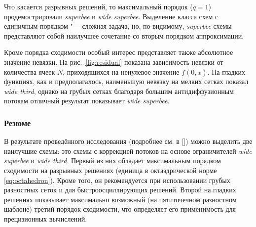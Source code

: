 Что касается разрывных решений, то максимальный порядок (\(q=1\)) продемострировали \textit{superbee} и \textit{wide superbee}.
Выделение класса схем с единичным порядком "--- сложная задача, но, по-видимому,
\textit{superbee} схемы представляют собой наилучшее сочетание со вторым порядком аппроксимации.

Кроме порядка сходимости особый интерес представляет также абсолютное значение невязки.
На рис.~\ref{fig:residual} показана зависимость невязки от количества ячеек \(N\), приходящихся на ненулевое значение \(f(0,x)\).
На гладких функциях, как и предполагалось, наименьшую невязку на мелких сетках показал \textit{wide third},
однако на грубых сетках благодаря большим антидиффузионным потокам отличный результат показывает \textit{wide superbee}.

\subsubsection{Резюме}

В результате проведённого исследования (подробнее см. в []) можно выделить две наилучшие схемы:
это схемы с коррекцией потоков на основе ограничителей \textit{wide superbee} и \textit{wide third}.
Первый из них обладает максимальным порядком сходимости на разрывных решениях (единица в октаэдрической норме \eqref{eq:octahedron}).
Кроме того, он рекомендуется при использовании грубых разностных сеток и для быстроосциллирующих решений.
Второй на гладких решениях показывает максимально возможный (на пятиточечном разностном шаблоне) третий порядок сходимости,
что определяет его применимость для прецизионных вычислений.